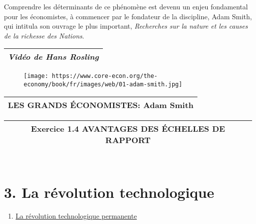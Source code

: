 \documentclass[11pt]{amsart}
\begin{document}
Comprendre les déterminants de ce phénomène est devenu un enjeu fondamental pour les économistes, à commencer par le fondateur de la discipline, Adam Smith, qui intitula son ouvrage le plus important, \emph{Recherches sur la nature et les causes de la richesse des Nations}.


\begin{center}
\begin{tabular}{|c|}
\hline
\emph{Vidéo de Hans Rosling} \\ 
\hline
\end{tabular}
\end{center}

\begin{figure}[h]{}
\centering\texttt{[image: https://www.core-econ.org/the-economy/book/fr/images/web/01-adam-smith.jpg]}
\caption{}

\end{figure}

\begin{center}
\begin{tabular}{|c|}
\hline
\textbf{LES GRANDS ÉCONOMISTES: Adam Smith} \\ 
\hline
\end{tabular}
\end{center}

\begin{center}
\begin{tabular}{|c|}
\hline
\textbf{Exercice 1.4 AVANTAGES DES ÉCHELLES DE RAPPORT} \\ 
\hline
\end{tabular}
\end{center}

\begin{center}
\begin{tabular}{|c|}
\hline
\hline
\end{tabular}
\end{center}

\begin{center}
\begin{tabular}{|c|}
\hline
\hline
\end{tabular}
\end{center}

\hypertarget{x-3.-la-révolution-technologique}{\section*{3. La révolution technologique}}
\begin{enumerate}

\item{\href{https://www.core-econ.org/the-economy/book/fr/text/01.html#14-la-r%C3%A9volution-technologique-permanente}{La révolution technologique permanente}}

\end{enumerate}
\end{document}

